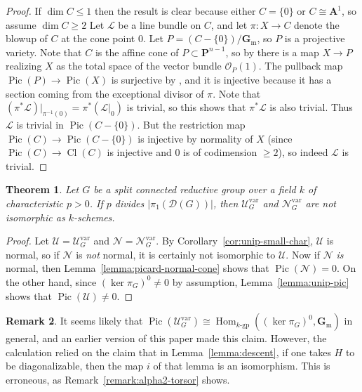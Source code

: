\documentclass[11pt,reqno]{amsart}
\newtheorem{theorem}{Theorem}[section]
\theoremstyle{definition}
\newtheorem{remark}[theorem]{Remark}
\renewcommand{\rm}{\mathrm}
\newcommand{\bA}{{\mathbf A}}
\newcommand{\bG}{{\mathbf G}}
\newcommand{\bP}{{\mathbf P}}
\newcommand{\sD}{{\mathscr D}}
\newcommand{\sL}{{\mathscr L}}
\newcommand{\sN}{{\mathscr N}}
\newcommand{\sO}{{\mathscr O}}
\newcommand{\sU}{{\mathscr U}}
\newcommand{\bGm}{\bG_{\rm{m}}}
\DeclareMathOperator{\Cl}{Cl}
\DeclareMathOperator{\Hom}{Hom}
\DeclareMathOperator{\Pic}{Pic}
\begin{document}
\begin{proof}
If $\dim C \leq 1$ then the result is clear because either $C = \{0\}$ or $C \cong \bA^1$, so assume $\dim C \geq 2$ Let $\sL$ be a line bundle on $C$, and let $\pi: X \to C$ denote the blowup of $C$ at the cone point $0$. Let $P = (C - \{0\})/\bGm$, so $P$ is a projective variety. Note that $C$ is the affine cone of $P \subset \bP^{n-1}$, so by \cite[II, Remarque 8.7.8]{EGA} there is a map $X \to P$ realizing $X$ as the total space of the vector bundle $\sO_P(1)$. The pullback map $\Pic(P) \to \Pic(X)$ is surjective by \cite[Proposition 1.9]{Fulton}, and it is injective because it has a section coming from the exceptional divisor of $\pi$. Note that $(\pi^*\sL)|_{\pi^{-1}(0)} = \pi^*(\sL|_{0})$ is trivial, so this shows that $\pi^*\sL$ is also trivial. Thus $\sL$ is trivial in $\Pic(C - \{0\})$. But the restriction map $\Pic(C) \to \Pic(C - \{0\})$ is injective by normality of $X$ (since $\Pic(C) \to \Cl(C)$ is injective and $0$ is of codimension $\geq 2$), so indeed $\sL$ is trivial.
\end{proof}

\begin{theorem}\label{theorem:no-springer-iso}
Let $G$ be a split connected reductive group over a field $k$ of characteristic $p > 0$. If $p$ divides $|\pi_1(\sD(G))|$, then $\sU_G^{\rm{var}}$ and $\sN_G^{\rm{var}}$ are not isomorphic as $k$-schemes.
\end{theorem}

\begin{proof}
Let $\sU = \sU_G^{\rm{var}}$ and $\sN = \sN_G^{\rm{var}}$. By Corollary~\ref{cor:unip-small-char}, $\sU$ is normal, so if $\sN$ is \textit{not} normal, it is certainly not isomorphic to $\sU$. Now if $\sN$ \textit{is} normal, then Lemma~\ref{lemma:picard-normal-cone} shows that $\Pic(\sN) = 0$. On the other hand, since $(\ker \pi_G)^0 \neq 0$ by assumption, Lemma~\ref{lemma:unip-pic} shows that $\Pic(\sU) \neq 0$.
\end{proof}

\begin{remark}\label{remark:guess-at-full-pic}
	It seems likely that $\Pic(\sU_G^{\rm{var}}) \cong \Hom_{k\textrm{-}\mathrm{gp}}((\ker \pi_G)^0, \bGm)$ in general, and an earlier version of this paper made this claim. However, the calculation relied on the claim that in Lemma~\ref{lemma:descent}, if one takes $H$ to be diagonalizable, then the map $i$ of that lemma is an isomorphism. This is erroneous, as Remark~\ref{remark:alpha2-torsor} shows.
\end{remark}
\end{document}
